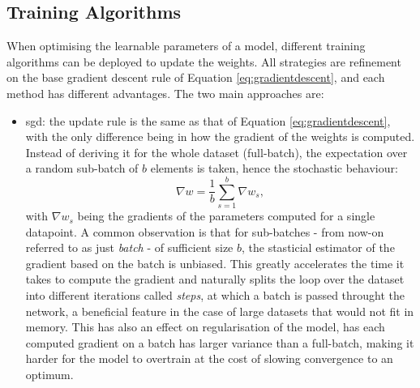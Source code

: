 \subsection{Training Algorithms}
When optimising the learnable parameters of a model, different training algorithms can be deployed to update the weights. All strategies are refinement on the base gradient descent rule of Equation \ref{eq:gradientdescent}, and each method has different advantages. The two main approaches are: 
\begin{itemize}
    \item \gls{sgd}: the update rule is the same as that of Equation \ref{eq:gradientdescent}, with the only difference being in how the gradient of the weights is computed. Instead of deriving it for the whole dataset (full-batch), the expectation over a random sub-batch of $b$ elements is taken, hence the stochastic behaviour: \[ \nabla w = \frac{1}{b} \sum_{s=1}^b \nabla w_s,\] with $\nabla w_s$ being the gradients of the parameters computed for a single datapoint. A common observation is that for sub-batches - from now-on referred to as just \textit{batch} - of sufficient size $b$, the stasticial estimator of the gradient based on the batch is unbiased. This greatly accelerates the time it takes to compute the gradient and naturally splits the loop over the dataset into different iterations called \textit{steps}, at which a batch is passed throught the network, a beneficial feature in the case of large datasets that would not fit in memory. This has also an effect on regularisation of the model, has each computed gradient on a batch has larger variance than a full-batch, making it harder for the model to overtrain at the cost of slowing convergence to an optimum. 

\end{itemize}
